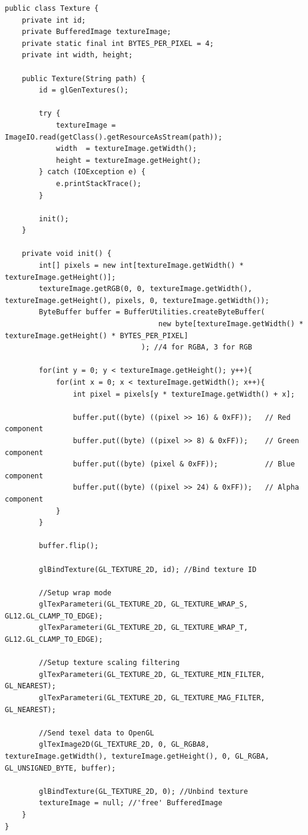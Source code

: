 \documentclass[12pt, 
openright, 
oneside, 
a4paper,    
brazil]{facom-ufu-abntex2}
\begin{document}
\begin{lstlisting}[caption=Inicializando uma textura no OpenGL a partir de um BufferedImage, label={alg:textureClass}]
public class Texture {
	private int id;
	private BufferedImage textureImage;
	private static final int BYTES_PER_PIXEL = 4;
	private int width, height;
	
	public Texture(String path) {
		id = glGenTextures();
		
		try {
			textureImage = ImageIO.read(getClass().getResourceAsStream(path));
			width  = textureImage.getWidth();
			height = textureImage.getHeight();
		} catch (IOException e) {
			e.printStackTrace();
		}
		
		init();
	}
	
	private void init() {
		int[] pixels = new int[textureImage.getWidth() * textureImage.getHeight()];
		textureImage.getRGB(0, 0, textureImage.getWidth(), textureImage.getHeight(), pixels, 0, textureImage.getWidth());
        ByteBuffer buffer = BufferUtilities.createByteBuffer(
        							new byte[textureImage.getWidth() * textureImage.getHeight() * BYTES_PER_PIXEL]
        						); //4 for RGBA, 3 for RGB
        
        for(int y = 0; y < textureImage.getHeight(); y++){
            for(int x = 0; x < textureImage.getWidth(); x++){
                int pixel = pixels[y * textureImage.getWidth() + x];
            
                buffer.put((byte) ((pixel >> 16) & 0xFF));   // Red component
                buffer.put((byte) ((pixel >> 8) & 0xFF));    // Green component
                buffer.put((byte) (pixel & 0xFF));           // Blue component
                buffer.put((byte) ((pixel >> 24) & 0xFF));   // Alpha component
            }
        }

        buffer.flip();

        glBindTexture(GL_TEXTURE_2D, id); //Bind texture ID
        
        //Setup wrap mode
        glTexParameteri(GL_TEXTURE_2D, GL_TEXTURE_WRAP_S, GL12.GL_CLAMP_TO_EDGE);
        glTexParameteri(GL_TEXTURE_2D, GL_TEXTURE_WRAP_T, GL12.GL_CLAMP_TO_EDGE);

        //Setup texture scaling filtering
        glTexParameteri(GL_TEXTURE_2D, GL_TEXTURE_MIN_FILTER, GL_NEAREST);
        glTexParameteri(GL_TEXTURE_2D, GL_TEXTURE_MAG_FILTER, GL_NEAREST);
        
        //Send texel data to OpenGL
        glTexImage2D(GL_TEXTURE_2D, 0, GL_RGBA8, textureImage.getWidth(), textureImage.getHeight(), 0, GL_RGBA, GL_UNSIGNED_BYTE, buffer);
        
        glBindTexture(GL_TEXTURE_2D, 0); //Unbind texture
        textureImage = null; //'free' BufferedImage
	}
}
\end{lstlisting}
\end{document}
